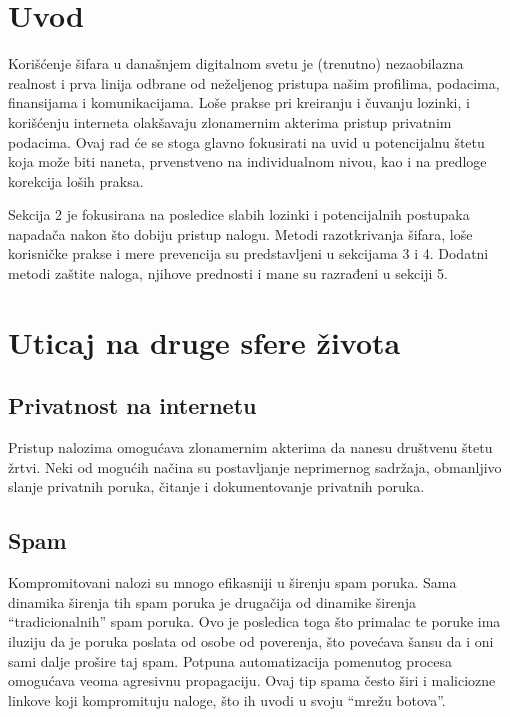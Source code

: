 \documentclass[fleqn, 12pt]{article}
\begin{document}


\setcounter{tocdepth}{2}
\tableofcontents

\newpage

\section{Uvod}
\indent Korišćenje šifara u današnjem digitalnom svetu je (trenutno) nezaobilazna realnost i prva linija odbrane od neželjenog pristupa našim profilima, podacima, finansijama i komunikacijama. Loše prakse pri kreiranju i čuvanju lozinki, i korišćenju interneta olakšavaju zlonamernim akterima pristup privatnim podacima. Ovaj rad će se stoga glavno fokusirati na uvid u potencijalnu štetu koja može biti naneta, prvenstveno na individualnom nivou, kao i na predloge korekcija loših praksa. 

Sekcija 2 je fokusirana na posledice slabih lozinki i potencijalnih postupaka napadača nakon što dobiju pristup nalogu. Metodi razotkrivanja šifara, loše korisničke prakse i mere prevencija su predstavljeni u sekcijama 3 i 4. Dodatni metodi zaštite naloga, njihove prednosti i mane su razrađeni u sekciji 5. 

\section{Uticaj na druge sfere života}

\subsection{Privatnost na internetu}
\indent Pristup nalozima omogućava zlonamernim akterima da nanesu društvenu štetu žrtvi. Neki od mogućih načina su postavljanje neprimernog sadržaja, obmanljivo slanje privatnih poruka, čitanje i dokumentovanje privatnih poruka.

\subsection{Spam}
\indent Kompromitovani nalozi su mnogo efikasniji u širenju spam poruka. Sama dinamika širenja tih spam poruka je drugačija od dinamike širenja ``tradicionalnih'' spam poruka. Ovo je posledica toga što primalac te poruke ima iluziju da je poruka poslata od osobe od poverenja, što povećava šansu da i oni sami dalje prošire taj spam. Potpuna automatizacija pomenutog procesa omogućava veoma agresivnu propagaciju. \cite{spam}
Ovaj tip spama često širi i maliciozne linkove koji kompromituju naloge, što ih uvodi u svoju ``mrežu botova''.
\end{document}
